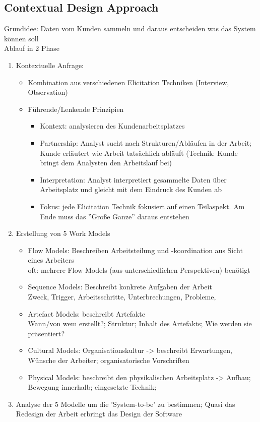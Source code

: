 \subsection{Contextual Design Approach}
Grundidee: Daten vom Kunden sammeln und daraus entscheiden was das System können soll\\
Ablauf in 2 Phase
\begin{enumerate}
	\item Kontextuelle Anfrage:
	\begin{itemize}
		\item Kombination aus verschiedenen Elicitation Techniken (Interview, Observation)
		\item Führende/Lenkende Prinzipien
		\begin{itemize}
			\item Kontext: analysieren des Kundenarbeitsplatzes
			\item Partnership: Analyst sucht nach Strukturen/Abläufen in der Arbeit; Kunde erläutert wie Arbeit tatsächlich abläuft (Technik: Kunde bringt dem Analysten den Arbeitslauf bei)
			\item Interpretation: Analyst interpretiert gesammelte Daten über Arbeitsplatz und gleicht mit dem Eindruck des Kunden ab
			\item Fokus: jede Elicitation Technik fokusiert auf einen Teilaspekt. Am Ende muss das ''Große Ganze'' daraus entstehen
		\end{itemize}
	\end{itemize}

	\item Erstellung von 5 Work Models
	\begin{itemize}
		\item Flow Models: Beschreiben Arbeitsteilung und -koordination aus Sicht eines Arbeiters\\
		oft: mehrere Flow Models (aus unterschiedlichen Perspektiven) benötigt
		\item Sequence Models: Beschreibt konkrete Aufgaben der Arbeit\\
		Zweck, Trigger, Arbeitsschritte, Unterbrechungen, Probleme,
		\item Artefact Models: beschreibt Artefakte\\
		Wann/von wem erstellt?; Struktur; Inhalt des Artefakts; Wie werden sie präsentiert?
		\item Cultural Models: Organisationskultur -> beschreibt Erwartungen, Wünsche der Arbeiter; organisatorische Vorschriften
		\item Physical Models: beschreibt den physikalischen Arbeitsplatz -> Aufbau; Bewegung innerhalb; eingesetzte Technik;
	\end{itemize}
	\item Analyse der 5 Modelle um die 'System-to-be' zu bestimmen; Quasi das Redesign der Arbeit erbringt das Design der Software
\end{enumerate} 